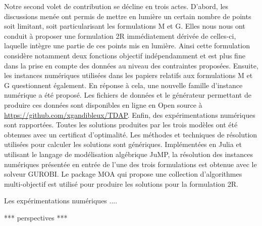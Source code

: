 \documentclass[preprint,12pt,authoryear]{elsarticle}
\begin{document}
Notre second volet de contribution se décline en trois actes.
%
D'abord,  les discussions menée ont permis de mettre en lumière un certain nombre de points soit limitant, soit particularisant les formulations M et G.
Elles nous nous ont conduit à proposer une formulation 2R immédiatement dérivée de celles-ci, laquelle intègre une partie de ces points mis en lumière.
Ainsi cette formulation considère notamment deux fonctions objectif indépendamment et est plus fine dans la prise en compte des données au niveau des contraintes proposées.
%
Ensuite, les instances numériques utilisées dans les papiers relatifs aux formulations M et G questionnent également.
En réponse à cela, une nouvelle famille d’instance numérique a été proposé. Les fichiers de données et le générateur permettant de produire ces données sont disponibles en ligne en Open source à \url{https://github.com/xgandibleux/TDAP}.
%
Enfin, des expérimentations numériques sont rapportées.
Toutes les solutions produites par les trois modèles ont été obtenues avec un certificat d’optimalité.
Les méthodes et techniques de résolution utilisées pour calculer les solutions sont génériques. 
Implémentées en Julia et utilisant le langage de modélisation algébrique JuMP, la résolution des instances numériques présentée en entrée de l'une des trois formulations est obtenue avec le solveur GUROBI. Le package MOA qui propose une collection d'algorithmes multi-objectif est utilisé pour produire les solutions pour la formulation 2R. 

Les expérimentations numériques .... %

*** perspectives ***
\color{black}
\end{document}
